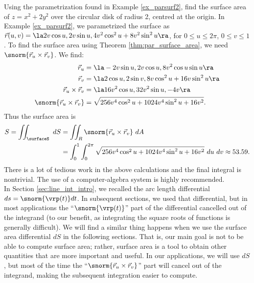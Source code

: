 {Using the parametrization found in Example \ref{ex_parsurf2}, find the surface area of $z=x^2+2y^2$ over the circular disk of radius 2, centred at the origin.
}
{In Example \ref{ex_parsurf2}, we parametrized the surface as $\vec r(u,v) = \la 2v\cos u, 2v\sin u, 4v^2\cos^2u+8v^2\sin^2u\ra$, for $0\leq u\leq 2\pi$, $0\leq v\leq 1$. To find the surface area using Theorem \ref{thm:par_surface_area}, we need $\snorm{\vec r_u\times\vec r_v}$. We find:
\begin{align*}
\vec r_u &= \la -2v\sin u, 2v\cos u, 8v^2\cos u\sin u\ra\\
\vec r_v &= \la 2\cos u, 2\sin v, 8v\cos^2 u+16v\sin^2u\ra\\
\vec r_u\times\vec r_v &= \la 16v^2\cos u, 32v^2\sin u, -4v\ra\\
\snorm{\vec r_u\times\vec r_v} &= \sqrt{256v^4\cos^2u+1024v^4\sin^2u+16v^2}.
\end{align*}
Thus the surface area is
\begin{align*}
S = \iint_\surfaceS \ dS &= \iint_R\snorm{\vec r_u\times \vec r_v}\ dA \\
& = \int_0^1\int_0^{2\pi} \sqrt{256v^4\cos^2u+1024v^4\sin^2u+16v^2}\ du\ dv \approx 53.59.
\end{align*}
There is a lot of tedious work in the above calculations and the final integral is nontrivial. The use of a computer-algebra system is highly recommended.
}\\

In Section \ref{sec:line_int_intro}, we recalled the arc length differential $ds=\snorm{\vrp(t)}dt$. In subsequent sections, we used that differential, but in most applications the ``$\snorm{\vrp(t)}$'' part of the differential cancelled out of the integrand (to our benefit, as integrating the square roots of functions is generally difficult). We will find a similar thing happens when we use the surface area differential $dS$ in the following sections. That is, our main goal is not to be able to compute surface area; rather, surface area is a tool to obtain other quantities that are more important and useful. In our applications, we will use $dS$, but most of the time the ``$\snorm{\vec r_u\times \vec r_v}$'' part will cancel out of the integrand, making the subsequent integration easier to compute.

